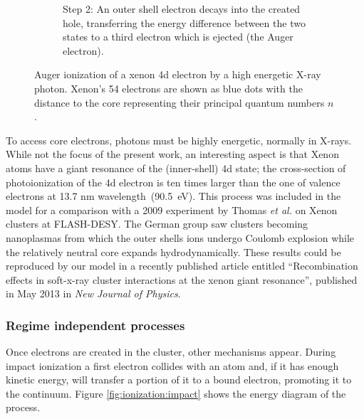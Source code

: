 \begin{figure}
\begin{subfigure}{0.48\columnwidth}
        \caption{Step 2: An outer shell electron decays into the created hole,
                 transferring the energy difference between the two states to a
                 third electron which is ejected (the Auger electron).}
        \label{fig:auger:2}
    \end{subfigure}
        \caption{\label{fig:auger}Auger ionization of a xenon 4d electron by a
                 high energetic X-ray photon. Xenon's 54 electrons are shown
                 as blue dots with the distance to the core representing their
                 principal quantum numbers $n$.}
\end{figure}

To access core electrons, photons must be highly energetic, normally in X-rays.
While not the focus of the present work, an interesting aspect is that Xenon
atoms have a giant resonance of the (inner-shell) 4d state; the cross-section of
photoionization of the 4d electron is ten times larger than the
one of valence  electrons at 13.7 nm wavelength~(90.5~eV)\cite{Becker1986}.
This process was included in the model for a comparison with a 2009 experiment
by Thomas \textit{et al.}\cite{Thomas2009} on Xenon clusters at FLASH-DESY.
The German group saw clusters becoming nanoplasmas from which the outer shells
ions undergo Coulomb explosion while the relatively neutral core expands
hydrodynamically. These results could be reproduced by our model in a recently
published article entitled ``Recombination effects in soft-x-ray cluster
interactions at the xenon giant resonance'', published in May 2013 in
\textit{New Journal of Physics}\cite{Ackad2013}.


\subsubsection{Regime independent processes}
\label{section:intro:mechanisms:noregime}

Once electrons are created in the cluster, other mechanisms appear. During
impact ionization a first electron collides with an atom and, if it has enough
kinetic energy, will transfer a portion of it to a bound electron, promoting it
to the continuum. Figure \ref{fig:ionization:impact} shows the energy diagram
of the process.

